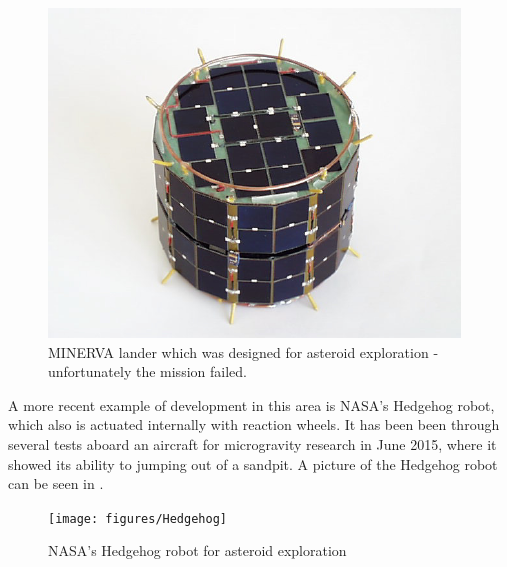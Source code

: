 \begin{figure}[H] 
	\centering
	\includegraphics[scale=.5]{figures/MINERVA}
	\caption{MINERVA lander which was designed for asteroid exploration - unfortunately the mission failed.}
	\label{MINERVA}
\end{figure}
%
A more recent example of development in this area is NASA's Hedgehog robot, which also is actuated internally with reaction wheels. It has been been through several tests aboard an aircraft for microgravity research in June 2015, where it showed its ability to jumping out of a sandpit. A picture of the Hedgehog robot can be seen in .
%
\begin{figure}[H] 
	\centering
	\texttt{[image: figures/Hedgehog]}
	\caption{NASA's Hedgehog robot for asteroid exploration}
	\label{Hedgehog}
\end{figure}